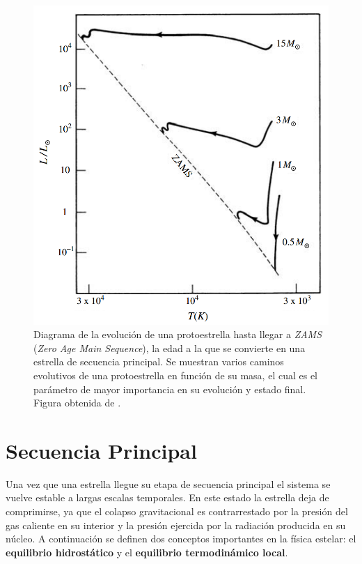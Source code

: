 \begin{figure}[!ht]
	\centering
	\includegraphics[scale=0.27]{Introduccion/Figures/EvolucionZAMSFormacionEstelar_Kutner.png}
	\caption{Diagrama de la evolución de una protoestrella hasta llegar a
	\textit{ZAMS} (\textit{Zero Age Main Sequence}), la edad a la que se
	convierte en una estrella de secuencia principal. Se muestran varios caminos
	evolutivos de una protoestrella en función de su masa, el cual es el
	parámetro de mayor importancia en su evolución y estado final. Figura
	obtenida de .}
	\label{protostarEvolutionFig}
\end{figure}

\section{Secuencia Principal}

Una vez que una estrella llegue su etapa de secuencia principal el sistema se
vuelve estable a largas escalas temporales. En este estado la estrella deja de
comprimirse, ya que el colapso gravitacional es contrarrestado por la presión
del gas caliente en su interior y la presión ejercida por la radiación producida
en su núcleo. A continuación se definen dos conceptos importantes en la física
estelar: el \textbf{equilibrio hidrostático} y el \textbf{equilibrio
termodinámico local}.

